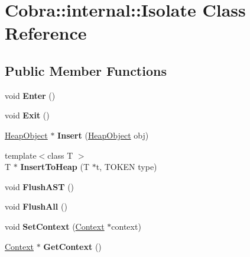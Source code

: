 \hypertarget{class_cobra_1_1internal_1_1_isolate}{\section{Cobra\+:\+:internal\+:\+:Isolate Class Reference}
\label{class_cobra_1_1internal_1_1_isolate}
}
\subsection*{Public Member Functions}
\begin{DoxyCompactItemize}
\item 
\hypertarget{class_cobra_1_1internal_1_1_isolate_abc6ce041311035d0e917119f6498d2db}{void {\bfseries Enter} ()}\label{class_cobra_1_1internal_1_1_isolate_abc6ce041311035d0e917119f6498d2db}

\item 
\hypertarget{class_cobra_1_1internal_1_1_isolate_aa966378a720680a07228f9a373ede884}{void {\bfseries Exit} ()}\label{class_cobra_1_1internal_1_1_isolate_aa966378a720680a07228f9a373ede884}

\item 
\hypertarget{class_cobra_1_1internal_1_1_isolate_a9dce7bc569dfe1265e0bf4bb0eabc8b6}{\hyperlink{struct_cobra_1_1internal_1_1_heap_object}{Heap\+Object} $\ast$ {\bfseries Insert} (\hyperlink{struct_cobra_1_1internal_1_1_heap_object}{Heap\+Object} obj)}\label{class_cobra_1_1internal_1_1_isolate_a9dce7bc569dfe1265e0bf4bb0eabc8b6}

\item 
\hypertarget{class_cobra_1_1internal_1_1_isolate_a10d48684b74fcdefaaddb264e2c1d121}{{\footnotesize template$<$class T $>$ }\\T $\ast$ {\bfseries Insert\+To\+Heap} (T $\ast$t, T\+O\+K\+E\+N type)}\label{class_cobra_1_1internal_1_1_isolate_a10d48684b74fcdefaaddb264e2c1d121}

\item 
\hypertarget{class_cobra_1_1internal_1_1_isolate_a87b1ff838a1ae533c775a601ab7dafb2}{void {\bfseries Flush\+A\+S\+T} ()}\label{class_cobra_1_1internal_1_1_isolate_a87b1ff838a1ae533c775a601ab7dafb2}

\item 
\hypertarget{class_cobra_1_1internal_1_1_isolate_a97a78a3e571d29e9be6ea06c97cb7f33}{void {\bfseries Flush\+All} ()}\label{class_cobra_1_1internal_1_1_isolate_a97a78a3e571d29e9be6ea06c97cb7f33}

\item 
\hypertarget{class_cobra_1_1internal_1_1_isolate_a58d4918a76222420143b75c59e1e9f21}{void {\bfseries Set\+Context} (\hyperlink{class_cobra_1_1internal_1_1_context}{Context} $\ast$context)}\label{class_cobra_1_1internal_1_1_isolate_a58d4918a76222420143b75c59e1e9f21}

\item 
\hypertarget{class_cobra_1_1internal_1_1_isolate_a63d249ac4df7862ca1ac84c4f8df4ea3}{\hyperlink{class_cobra_1_1internal_1_1_context}{Context} $\ast$ {\bfseries Get\+Context} ()}\label{class_cobra_1_1internal_1_1_isolate_a63d249ac4df7862ca1ac84c4f8df4ea3}

\end{DoxyCompactItemize}
